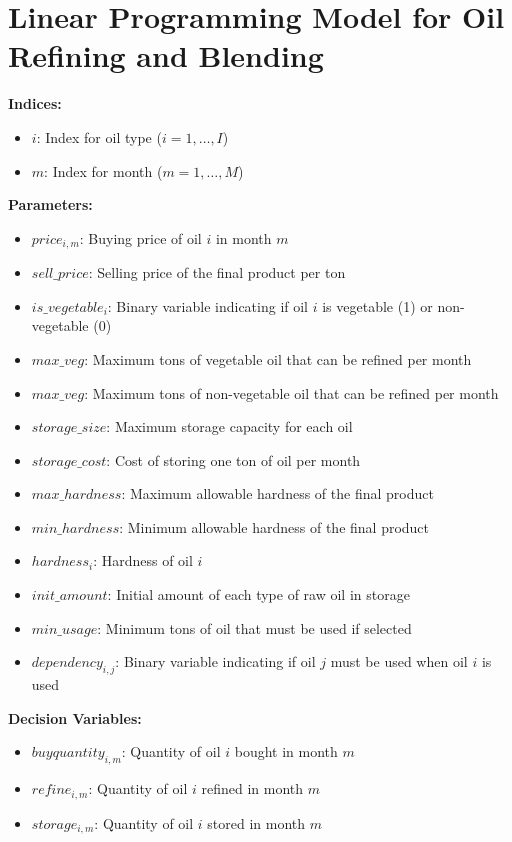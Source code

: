 \documentclass{article}
\begin{document}
\section*{Linear Programming Model for Oil Refining and Blending}

\textbf{Indices:}
\begin{itemize}
    \item $i$: Index for oil type ($i = 1, \ldots, I$)
    \item $m$: Index for month ($m = 1, \ldots, M$)
\end{itemize}

\textbf{Parameters:}
\begin{itemize}
    \item $price_{i,m}$: Buying price of oil $i$ in month $m$
    \item $sell\_price$: Selling price of the final product per ton
    \item $is\_vegetable_{i}$: Binary variable indicating if oil $i$ is vegetable (1) or non-vegetable (0)
    \item $max\_veg$: Maximum tons of vegetable oil that can be refined per month
    \item $max\_veg$: Maximum tons of non-vegetable oil that can be refined per month
    \item $storage\_size$: Maximum storage capacity for each oil
    \item $storage\_cost$: Cost of storing one ton of oil per month
    \item $max\_hardness$: Maximum allowable hardness of the final product
    \item $min\_hardness$: Minimum allowable hardness of the final product
    \item $hardness_{i}$: Hardness of oil $i$
    \item $init\_amount$: Initial amount of each type of raw oil in storage
    \item $min\_usage$: Minimum tons of oil that must be used if selected
    \item $dependency_{i,j}$: Binary variable indicating if oil $j$ must be used when oil $i$ is used
\end{itemize}

\textbf{Decision Variables:}
\begin{itemize}
    \item $buyquantity_{i,m}$: Quantity of oil $i$ bought in month $m$
    \item $refine_{i,m}$: Quantity of oil $i$ refined in month $m$
    \item $storage_{i,m}$: Quantity of oil $i$ stored in month $m$
\end{itemize}
\end{document}
